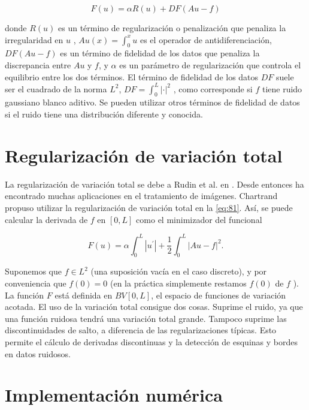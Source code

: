 \begin{equation}\label{eq:81}
F(u)=\alpha R(u) +DF\left(Au-f\right)
\end{equation}


donde  $R(u)$  es un término de regularización o penalización que penaliza la irregularidad en  $u$ , $Au(x)=\int_{0}^{x}u$  es el operador de antidiferenciación,  $DF\left(Au-f\right)$  es un término de fidelidad de los datos que penaliza la discrepancia entre $Au$ y $f$, y $\alpha$  es un parámetro de regularización que controla el equilibrio entre los dos términos.  El término de fidelidad de los datos $DF$ suele ser el cuadrado de la norma $L^2$, $DF=\int_{0}^{L} \left| \cdot \right|^2$ , como corresponde si $f$  tiene ruido gaussiano blanco aditivo. Se pueden utilizar otros términos de fidelidad de datos si el ruido tiene una distribución diferente y conocida.

\section{ Regularización de variación total }

La regularización de variación total se debe a Rudin et al. en \cite{rudin_nonlinear_1992}. Desde entonces ha encontrado muchas aplicaciones en el tratamiento de imágenes.  Chartrand \cite{chartrand_numerical_2011}  propuso  utilizar la regularización de variación total en la \cref{eq:81}. Así, se puede calcular  la derivada de  $f$  en  $[0,L]$  como el minimizador del funcional 

\begin{equation}\label{eq:82}
	F(u)=\alpha\int_{0}^{L}\left|u^\prime \right| +\frac{1}{2}\int_{0}^{L}\left| Au-f\right|^2. 
\end{equation}

Suponemos que $f\in L^2$ (una suposición vacía en el caso discreto), y por conveniencia que $f(0)=0$ (en la práctica simplemente restamos $f(0)$ de $f$ ). La función $F$ está definida en $BV[0,L]$, el espacio de funciones de variación acotada.   El uso de la variación total consigue dos cosas. Suprime el ruido, ya que una función ruidosa tendrá una variación total grande. Tampoco suprime las discontinuidades de salto, a diferencia de las regularizaciones típicas. Esto permite el cálculo de derivadas discontinuas y la detección de esquinas y bordes en datos ruidosos.

\section{Implementación numérica}

